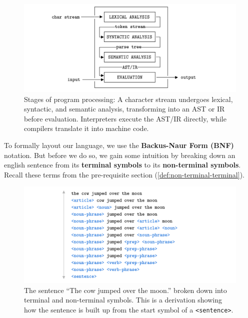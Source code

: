 \begin{figure}[h]
    \centering
    \includegraphics[width=1\textwidth]{Sections/Formal/comp2.png}
    \caption{Stages of program processing: A character stream undergoes lexical, syntactic, and semantic analysis, transforming into an AST or IR before evaluation. Interpreters execute the AST/IR directly, while compilers translate it into machine code.}
\end{figure}

\newpage
    
\noindent
\noindent
To formally layout our language, we use the \textbf{Backus-Naur Form (BNF)} notation. But before we 
do so, we gain some intuition by breaking down an english sentence from its \textbf{terminal symbols} to its \textbf{non-terminal symbols}. Recall these terms from the pre-requisite section (\ref{def:non-terminal-terminal}).\\

\begin{figure}[h]
    \centering
    \includegraphics[width=1\textwidth]{Sections/Formal/derivation.png}
    \caption{The sentence ``The cow jumped over the moon.'' broken down into terminal and non-terminal symbols. This is a derivation showing how the sentence is built up from the start symbol of a \texttt{<sentence>}.}
\end{figure}

